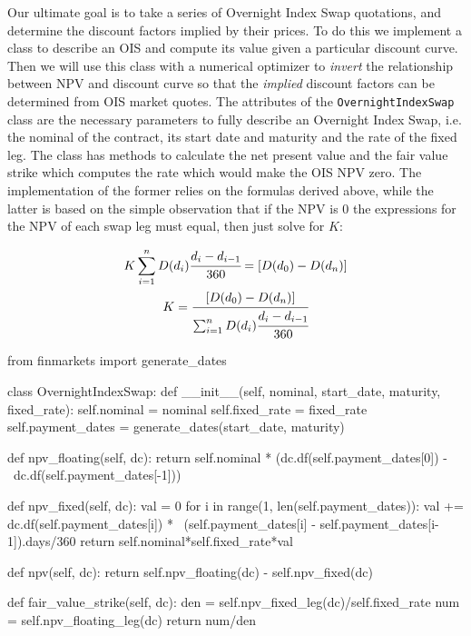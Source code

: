 \begin{finmarkets}
Our ultimate goal is to take a series of Overnight Index Swap quotations, and determine the discount factors implied by their prices. To do this we implement a class to describe an OIS and compute its value given a particular discount curve. Then we will use this class with a numerical optimizer to \emph{invert} the relationship between NPV and discount curve so that the \emph{implied} discount factors can be determined from OIS market quotes.
The attributes of the \texttt{OvernightIndexSwap} class are the necessary parameters to fully describe an Overnight Index Swap, i.e. the nominal of the contract, its start date and maturity and the rate of the fixed leg. The class has methods to calculate the net present value and the fair value strike which computes the rate which would make the OIS NPV zero. The implementation of the former relies on the formulas derived above, while the latter is based on the simple observation that if the NPV is 0 the expressions for the NPV of each swap leg must equal, then just solve for $K$:

\begin{equation}
\begin{gathered}
K \sum_{i=1}^{n}D(d_{i})\cfrac{d_i - d_{i-1}}{360} = [D(d_0) - D(d_n)] \\
K = \cfrac{[D(d_0) - D(d_n)]}{\sum_{i=1}^{n}D(d_{i})\cfrac{d_i - d_{i-1}}{360}}
\end{gathered}
\end{equation}
\end{finmarkets}

\begin{ipython}
from finmarkets import generate_dates

class OvernightIndexSwap:
    def __init__(self, nominal, start_date, maturity, fixed_rate):
        self.nominal = nominal
        self.fixed_rate = fixed_rate
        self.payment_dates = generate_dates(start_date, maturity)
      
    def npv_floating(self, dc):
        return self.nominal * (dc.df(self.payment_dates[0]) - \
                               dc.df(self.payment_dates[-1]))
  
    def npv_fixed(self, dc):
        val = 0
        for i in range(1, len(self.payment_dates)):
            val += dc.df(self.payment_dates[i]) * \
                    (self.payment_dates[i] - self.payment_dates[i-1]).days/360 
        return self.nominal*self.fixed_rate*val
  
    def npv(self, dc):
        return self.npv_floating(dc) - self.npv_fixed(dc)

    def fair_value_strike(self, dc):
        den = self.npv_fixed_leg(dc)/self.fixed_rate
        num = self.npv_floating_leg(dc)
        return num/den
\end{ipython}

